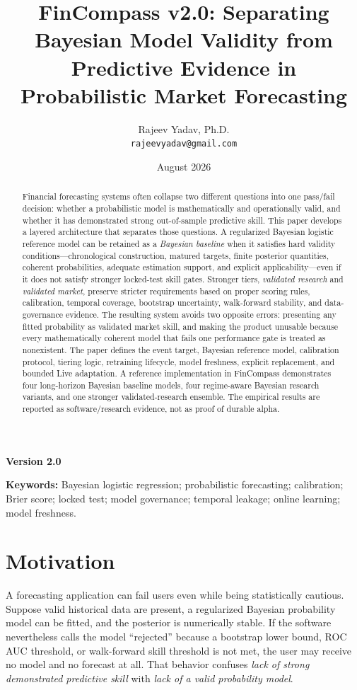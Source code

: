 \documentclass[11pt]{article}
\title{\textbf{FinCompass v2.0: Separating Bayesian Model Validity from Predictive Evidence in Probabilistic Market Forecasting}}
\author{Rajeev Yadav, Ph.D.\\\texttt{rajeevyadav@gmail.com}}
\date{August 2026}
\begin{document}
\maketitle
\begin{center}
\textbf{Version 2.0}
\end{center}

\begin{abstract}
Financial forecasting systems often collapse two different questions into one pass/fail decision: whether a probabilistic model is mathematically and operationally valid, and whether it has demonstrated strong out-of-sample predictive skill. This paper develops a layered architecture that separates those questions. A regularized Bayesian logistic reference model can be retained as a \emph{Bayesian baseline} when it satisfies hard validity conditions---chronological construction, matured targets, finite posterior quantities, coherent probabilities, adequate estimation support, and explicit applicability---even if it does not satisfy stronger locked-test skill gates. Stronger tiers, \emph{validated research} and \emph{validated market}, preserve stricter requirements based on proper scoring rules, calibration, temporal coverage, bootstrap uncertainty, walk-forward stability, and data-governance evidence. The resulting system avoids two opposite errors: presenting any fitted probability as validated market skill, and making the product unusable because every mathematically coherent model that fails one performance gate is treated as nonexistent. The paper defines the event target, Bayesian reference model, calibration protocol, tiering logic, retraining lifecycle, model freshness, explicit replacement, and bounded Live adaptation. A reference implementation in FinCompass demonstrates four long-horizon Bayesian baseline models, four regime-aware Bayesian research variants, and one stronger validated-research ensemble. The empirical results are reported as software/research evidence, not as proof of durable alpha.
\end{abstract}

\noindent\textbf{Keywords:} Bayesian logistic regression; probabilistic forecasting; calibration; Brier score; locked test; model governance; temporal leakage; online learning; model freshness.

\section{Motivation}
A forecasting application can fail users even while being statistically cautious. Suppose valid historical data are present, a regularized Bayesian probability model can be fitted, and the posterior is numerically stable. If the software nevertheless calls the model ``rejected'' because a bootstrap lower bound, ROC AUC threshold, or walk-forward skill threshold is not met, the user may receive no model and no forecast at all. That behavior confuses \emph{lack of strong demonstrated predictive skill} with \emph{lack of a valid probability model}.
\end{document}
